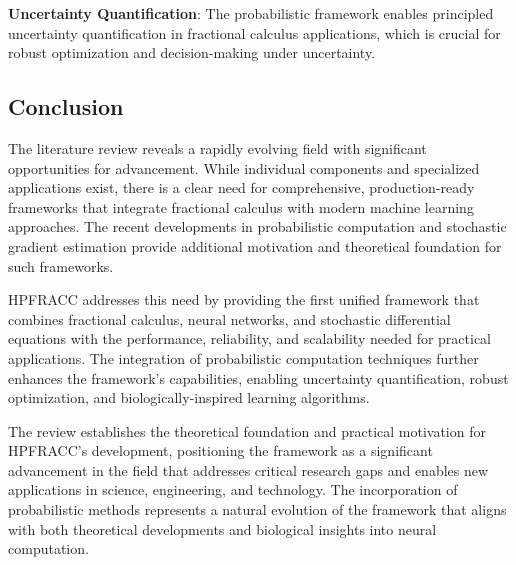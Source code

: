 \textbf{Uncertainty Quantification}: The probabilistic framework enables principled uncertainty quantification in fractional calculus applications, which is crucial for robust optimization and decision-making under uncertainty.

\subsection{Conclusion}

The literature review reveals a rapidly evolving field with significant opportunities for advancement. While individual components and specialized applications exist, there is a clear need for comprehensive, production-ready frameworks that integrate fractional calculus with modern machine learning approaches. The recent developments in probabilistic computation and stochastic gradient estimation provide additional motivation and theoretical foundation for such frameworks.

HPFRACC addresses this need by providing the first unified framework that combines fractional calculus, neural networks, and stochastic differential equations with the performance, reliability, and scalability needed for practical applications. The integration of probabilistic computation techniques further enhances the framework's capabilities, enabling uncertainty quantification, robust optimization, and biologically-inspired learning algorithms.

The review establishes the theoretical foundation and practical motivation for HPFRACC's development, positioning the framework as a significant advancement in the field that addresses critical research gaps and enables new applications in science, engineering, and technology. The incorporation of probabilistic methods represents a natural evolution of the framework that aligns with both theoretical developments and biological insights into neural computation.
